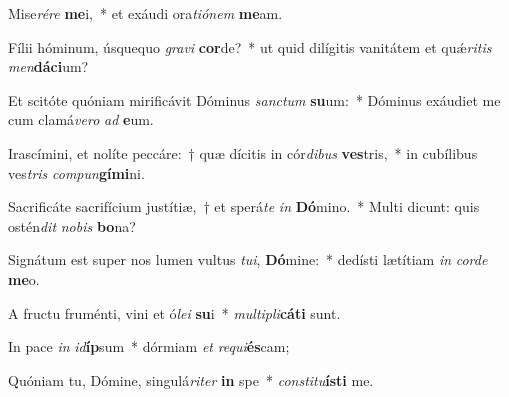 \item Mise\textit{ré}\textit{re} \textbf{me}i,~* et exáudi ora\textit{ti}\textit{ó}\textit{nem} \textbf{me}am.
\item Fílii hóminum, úsquequo \textit{gra}\textit{vi} \textbf{cor}de?~* ut quid dilígitis vanitátem et quǽ\textit{ri}\textit{tis} \textit{men}\textbf{dá}\textbf{ci}um?
\item Et scitóte quóniam mirificávit Dóminus \textit{sanc}\textit{tum} \textbf{su}um:~* Dóminus exáudiet me cum clamá\textit{ve}\textit{ro} \textit{ad} \textbf{e}um.
\item Irascímini, et nolíte peccáre:~† quæ dícitis in cór\textit{di}\textit{bus} \textbf{ves}tris,~* in cubílibus ves\textit{tris} \textit{com}\textit{pun}\textbf{gí}\textbf{mi}ni.
\item Sacrificáte sacrifícium justítiæ,~† et sperá\textit{te} \textit{in} \textbf{Dó}mino.~* Multi dicunt: quis ostén\textit{dit} \textit{no}\textit{bis} \textbf{bo}na?
\item Signátum est super nos lumen vultus \textit{tu}\textit{i}, \textbf{Dó}mine:~* dedísti lætítiam \textit{in} \textit{cor}\textit{de} \textbf{me}o.
\item A fructu fruménti, vini et ó\textit{le}\textit{i} \textbf{su}i~* \textit{mul}\textit{ti}\textit{pli}\textbf{cá}\textbf{ti} sunt.
\item In pace \textit{in} \textit{id}\textbf{íp}sum~* dórmiam \textit{et} \textit{re}\textit{qui}\textbf{és}cam;
\item Quóniam tu, Dómine, singulá\textit{ri}\textit{ter} \textbf{in} spe~* \textit{con}\textit{sti}\textit{tu}\textbf{ís}\textbf{ti} me.
